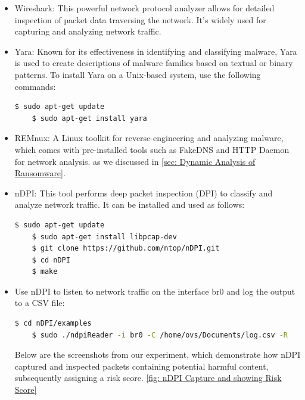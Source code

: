 \documentclass[12pt,letterpaper]{article}
\begin{document}
         \begin{itemize}
             \item  Wireshark: This powerful network protocol analyzer allows for detailed inspection of packet data traversing the network. It's widely used for capturing and analyzing network traffic.

            \item Yara: Known for its effectiveness in identifying and classifying malware, Yara is used to create descriptions of malware families based on textual or binary patterns. To install Yara on a Unix-based system, use the following commands:
\begin{lstlisting}[language=bash]
    $ sudo apt-get update
    $ sudo apt-get install yara
\end{lstlisting}   

        \item REMnux: A Linux toolkit for reverse-engineering and analyzing malware, which comes with pre-installed tools such as FakeDNS and HTTP Daemon for network analysis. as we discussed in \autoref{sec: Dynamic Analysis of Ransomware}.

        \item nDPI: This tool performs deep packet inspection (DPI) to classify and analyze network traffic. It can be installed and used as follows:

\begin{lstlisting}[language=bash]
    $ sudo apt-get update
    $ sudo apt-get install libpcap-dev
    $ git clone https://github.com/ntop/nDPI.git
    $ cd nDPI
    $ make
\end{lstlisting}  

        \item Use nDPI to listen to network traffic on the interface br0 and log the output to a CSV file:
\begin{lstlisting}[language=bash]
    $ cd nDPI/examples
    $ sudo ./ndpiReader -i br0 -C /home/ovs/Documents/log.csv -R
\end{lstlisting} 

   Below are the screenshots from our experiment, which demonstrate how nDPI captured and inspected packets containing potential harmful content, subsequently assigning a risk score. \autoref{fig: nDPI Capture and showing Risk Score}


\end{itemize}
\end{document}
